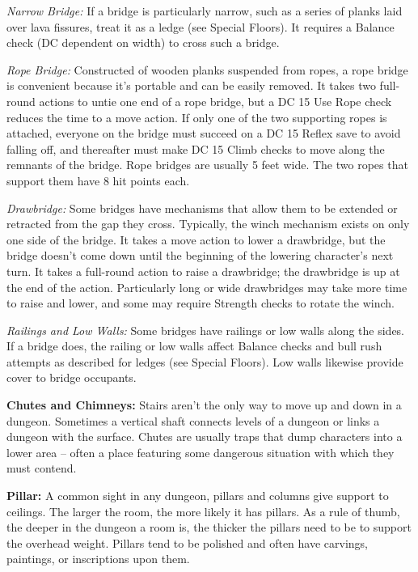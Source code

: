 \textit{Narrow Bridge:} If a bridge is particularly narrow, such as a series of 
planks laid over lava fissures, treat it as a ledge (see Special Floors). It requires 
a Balance check (DC dependent on width) to cross such a bridge.

\textit{Rope Bridge:} Constructed of wooden planks suspended from ropes, a rope 
bridge is convenient because it's portable and can be easily removed. It takes 
two full-round actions to untie one end of a rope bridge, but a DC 15 Use Rope 
check reduces the time to a move action. If only one of the two supporting ropes 
is attached, everyone on the bridge must succeed on a DC 15 Reflex save to avoid 
falling off, and thereafter must make DC 15 Climb checks to move along the remnants 
of the bridge. Rope bridges are usually 5 feet wide. The two ropes that support 
them have 8 hit points each.

\textit{Drawbridge:} Some bridges have mechanisms that allow them to be extended 
or retracted from the gap they cross. Typically, the winch mechanism exists on 
only one side of the bridge. It takes a move action to lower a drawbridge, but 
the bridge doesn't come down until the beginning of the lowering character's next 
turn. It takes a full-round action to raise a drawbridge; the drawbridge is up 
at the end of the action. Particularly long or wide drawbridges may take more time 
to raise and lower, and some may require Strength checks to rotate the winch.

\textit{Railings and Low Walls:} Some bridges have railings or low walls along 
the sides. If a bridge does, the railing or low walls affect Balance checks and 
bull rush attempts as described for ledges (see Special Floors). Low walls likewise 
provide cover to bridge occupants.

\textbf{Chutes and Chimneys:} Stairs aren't the only way to move up and down in 
a dungeon. Sometimes a vertical shaft connects levels of a dungeon or links a dungeon 
with the surface. Chutes are usually traps that dump characters into a lower area -- often 
a place featuring some dangerous situation with which they must contend.

\textbf{Pillar:} A common sight in any dungeon, pillars and columns give support 
to ceilings. The larger the room, the more likely it has pillars. As a rule of 
thumb, the deeper in the dungeon a room is, the thicker the pillars need to be 
to support the overhead weight. Pillars tend to be polished and often have carvings, 
paintings, or inscriptions upon them. 

